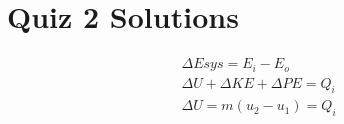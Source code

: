 \documentclass[10pt,a4paper]{article}
\begin{document}
\section*{Quiz 2 Solutions}
\begin{align*}
\Delta Esys = E_{i}-E_{o}\\
\Delta U + \Delta KE + \Delta PE = Q_{i}\\
\Delta U = m(u_{2}-u_{1})=Q_{i}
\end{align*}
\end{document}

